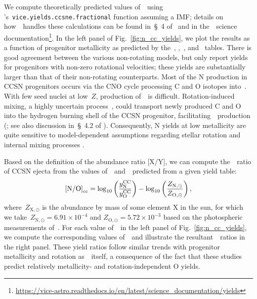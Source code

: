 \documentclass[ms.tex]{subfiles}
\begin{document}
We compute theoretically predicted values of~~using
\vice's~\texttt{vice.yields.ccsne.fractional} function assuming a
\citet{Kroupa2001} IMF; details on how~\vice~handles these calculations can be
found in~\S~4 of~\citet{Griffith2021a} and in the~\vice~science 
documentation\footnote{
\url{https://vice-astro.readthedocs.io/en/latest/science_documentation/yields}
}.
In the left panel of Fig.~\ref{fig:n_cc_yields}, we plot the results as a
function of progenitor metallicity as predicted by the~\citet{Woosley1995},
\citet*{Nomoto2013},~\citet{Sukhbold2016}, and~\citet{Limongi2018} tables.
There is good agreement between the various non-rotating models, but only
\citet{Limongi2018} report yields for progenitors with non-zero rotational
velocities; these yields are substantially larger than that of their
non-rotating counterparts.
Most of the N production in CCSN progenitors occurs via the CNO cycle
processing C and O isotopes into~\Nfourteen. 
With few seed nuclei at low~$Z$, production of~\Nfourteen~is difficult.
Rotation-induced mixing, a highly uncertain process~\citep{Zahn1992, Maeder1998,
Lagarde2012}, could transport newly produced C and O into the hydrogen burning
shell of the CCSN progenitor, facilitating~\Nfourteen~production
(\citealp{Frischknecht2016}; see also discussion in~\S~4.2 of
\citealp{Andrews2017}).
Consequently, N yields at low metallicity are quite sensitive to model-dependent
assumptions regarding stellar rotation and internal mixing processes
\citep{Heger2010}.
\par
Based on the definition of the abundance ratio [X/Y], we can compute
the~\no~ratio of CCSN ejecta from the values of~~and~~predicted
from a given yield table:
\begin{equation}
\text{[N/O]}_\text{cc} = 
\log_{10}\left(\frac{y_\text{N}^\text{CC}}{y_\text{O}^\text{CC}}\right) -
\log_{10}\left(\frac{Z_{\text{N},\odot}}{Z_{\text{O},\odot}}\right),
\label{eq:no_subcc}
\end{equation}
where~$Z_{\text{X},\odot}$ is the abundance by mass of some element X in the
sun, for which we take~$Z_{\text{N},\odot} = 6.91\times10^{-4}$ and
$Z_{\text{O},\odot} = 5.72\times10^{-3}$ based on the photospheric measurements
of~\citet{Asplund2009}.
For each value of~~in the left panel of Fig.~\ref{fig:n_cc_yields}, we
compute the corresponding values of~~and illustrate the
resultant~\no\subcc~ratios in the right panel.
These yield ratios follow similar trends with progenitor metallicity and
rotation as~~itself, a consequence of the fact that these
studies predict relatively metallicity- and rotation-independent O yields.
\end{document}
